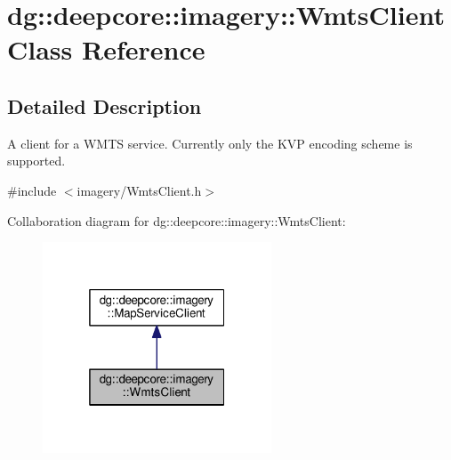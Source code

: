 \hypertarget{classdg_1_1deepcore_1_1imagery_1_1_wmts_client}{}\section{dg\+:\+:deepcore\+:\+:imagery\+:\+:Wmts\+Client Class Reference}
\label{classdg_1_1deepcore_1_1imagery_1_1_wmts_client}


\subsection{Detailed Description}
A client for a W\+M\+TS service. Currently only the K\+VP encoding scheme is supported. 

{\ttfamily \#include $<$imagery/\+Wmts\+Client.\+h$>$}



Collaboration diagram for dg\+:\+:deepcore\+:\+:imagery\+:\+:Wmts\+Client\+:
\nopagebreak
\begin{figure}[H]
\begin{center}
\leavevmode
\includegraphics[width=193pt]{classdg_1_1deepcore_1_1imagery_1_1_wmts_client__coll__graph}
\end{center}
\end{figure}
